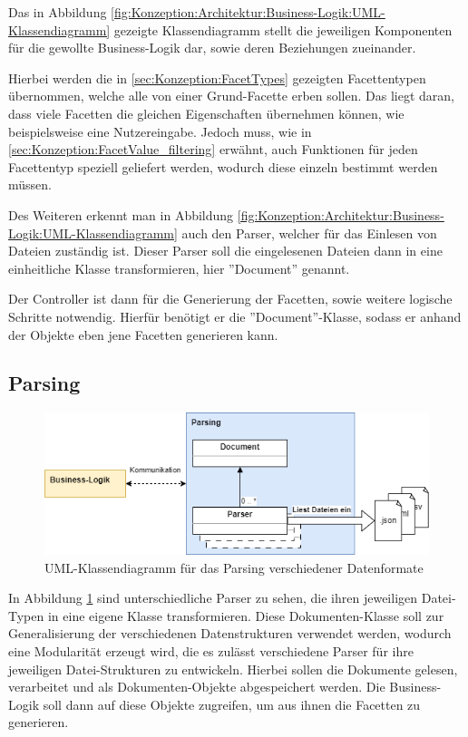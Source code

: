     Das in Abbildung \ref{fig:Konzeption:Architektur:Business-Logik:UML-Klassendiagramm} gezeigte Klassendiagramm stellt die jeweiligen Komponenten für die gewollte Business-Logik dar, sowie deren Beziehungen zueinander.

    Hierbei werden die in \ref{sec:Konzeption:FacetTypes} gezeigten Facettentypen übernommen, welche alle von einer Grund-Facette erben sollen.
    Das liegt daran, dass viele Facetten die gleichen Eigenschaften übernehmen können, wie beispielsweise eine Nutzereingabe.
    Jedoch muss, wie in \ref{sec:Konzeption:FacetValue_filtering} erwähnt, auch Funktionen für jeden Facettentyp speziell geliefert werden, wodurch diese einzeln bestimmt werden müssen.

    Des Weiteren erkennt man in Abbildung \ref{fig:Konzeption:Architektur:Business-Logik:UML-Klassendiagramm} auch den Parser, welcher für das Einlesen von Dateien zuständig ist.
    Dieser Parser soll die eingelesenen Dateien dann in eine einheitliche Klasse transformieren, hier ''Document'' genannt.

    Der Controller ist dann für die Generierung der Facetten, sowie weitere logische Schritte notwendig.
    Hierfür benötigt er die ''Document''-Klasse, sodass er anhand der Objekte eben jene Facetten generieren kann.

    \subsection{Parsing}
    \label{subsec:Konzeption:Architektur:Parsing}
    
    \begin{figure}[h]
        \centering
        \includegraphics[width=\textwidth]{chapters/3_Konzeption/res/Architektur/class-diagramm_Parsing.png}
        \caption{UML-Klassendiagramm für das Parsing verschiedener Datenformate}
        \label{fig:Konzeption:Architektur:Parsing:Klassendiagramm}
    \end{figure}
    
    In Abbildung \ref{fig:Konzeption:Architektur:Parsing:Klassendiagramm} sind unterschiedliche Parser zu sehen, die ihren jeweiligen Datei-Typen in eine eigene Klasse transformieren.
    Diese Dokumenten-Klasse soll zur Generalisierung der verschiedenen Datenstrukturen verwendet werden, wodurch eine Modularität erzeugt wird, die es zulässt verschiedene Parser für ihre jeweiligen Datei-Strukturen zu entwickeln.
    Hierbei sollen die Dokumente gelesen, verarbeitet und als Dokumenten-Objekte abgespeichert werden.
    Die Business-Logik soll dann auf diese Objekte zugreifen, um aus ihnen die Facetten zu generieren.
    
